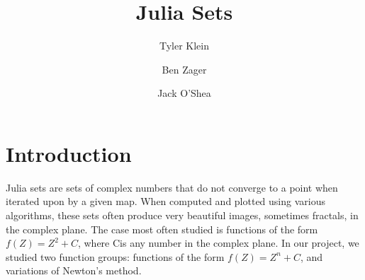 \documentclass[12pt]{article}
\title{Julia Sets}
\author{Tyler Klein\and Ben Zager\and Jack O'Shea}
\begin{document}
	
	
\maketitle
\section*{Introduction}
Julia sets are sets of complex numbers that do not converge to a point when iterated upon by a given map. When computed and plotted using various algorithms, these sets often produce very beautiful images, sometimes fractals, in the complex plane. The case most often studied is functions of the form $f(Z)= Z^2+C$, where Cis any number in the complex plane. In our project, we studied two function groups: functions of the form $f(Z)= Z^n+C$, and variations of Newton’s method.
\end{document}
